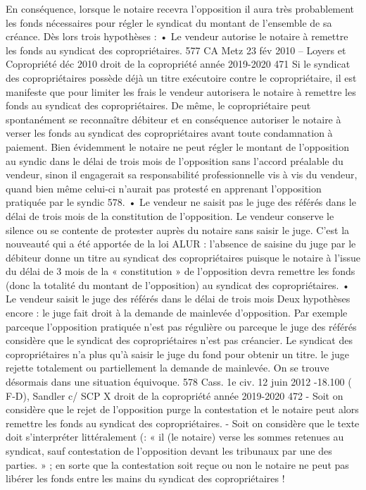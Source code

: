 En conséquence, lorsque le notaire recevra l'opposition il aura très probablement les fonds nécessaires pour régler le syndicat du montant de l'ensemble de sa créance.
Dès lors trois hypothèses :
• Le vendeur autorise le notaire à remettre les fonds au syndicat des copropriétaires.
577 CA Metz 23 fév 2010 – Loyers et Copropriété déc 2010 
droit de la copropriété année 2019-2020
471
Si le syndicat des copropriétaires possède déjà un titre exécutoire contre le copropriétaire, il est manifeste que pour limiter les frais le vendeur autorisera le notaire à remettre les fonds au syndicat des copropriétaires.
De même, le copropriétaire peut spontanément se reconnaître débiteur et en conséquence autoriser le notaire à verser les fonds au syndicat des copropriétaires avant toute condamnation à paiement.
Bien évidemment le notaire ne peut régler le montant de l’opposition au syndic dans le délai de trois mois de l’opposition sans l’accord préalable du vendeur, sinon il engagerait sa responsabilité professionnelle vis à vis du vendeur, quand bien même celui-ci n’aurait pas protesté en apprenant l’opposition pratiquée par le syndic 578.
• Le vendeur ne saisit pas le juge des référés dans le délai de trois mois de la constitution de l’opposition.
Le vendeur conserve le silence ou se contente de protester auprès du notaire sans saisir le juge.
C’est la nouveauté qui a été apportée de la loi ALUR : l’absence de saisine du juge par le débiteur donne un titre au syndicat des copropriétaires puisque le notaire à l’issue du délai de 3 mois de la « constitution » de l’opposition devra remettre les fonds (donc la totalité du montant de l’opposition) au syndicat des copropriétaires.
• Le vendeur saisit le juge des référés dans le délai de trois mois
Deux hypothèses encore :
\degres le juge fait droit à la demande de mainlevée d’opposition.
Par exemple parceque l’opposition pratiquée n’est pas régulière ou parceque le juge des référés considère que le syndicat des copropriétaires n’est pas créancier. Le syndicat des copropriétaires n’a plus qu’à saisir le juge du fond pour obtenir un titre.
\degres le juge rejette totalement ou partiellement la demande de mainlevée.
On se trouve désormais dans une situation équivoque.
578 Cass. 1e civ. 12 juin 2012 -18.100 ( F-D), Sandler c/ SCP X
droit de la copropriété année 2019-2020
472
- Soit on considère que le rejet de l’opposition purge la contestation et le notaire peut alors remettre les fonds au syndicat des copropriétaires.
- Soit on considère que le texte doit s’interpréter littéralement (: « il (le notaire) verse les sommes retenues au syndicat, sauf contestation de l’opposition devant les tribunaux par une des parties. » ; en sorte que la contestation soit reçue ou non le notaire ne peut pas libérer les fonds entre les mains du syndicat des copropriétaires !

